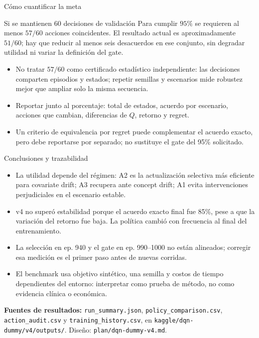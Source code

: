 \documentclass[aspectratio=169,10pt]{beamer}
\begin{document}
\begin{frame}{Cómo cuantificar la meta}
\begin{block}{Si se mantienen 60 decisiones de validación}
Para cumplir \(95\%\) se requieren al menos \(57/60\) acciones coincidentes.
El resultado actual es aproximadamente \(51/60\); hay que reducir al menos
seis desacuerdos en ese conjunto, sin degradar utilidad ni variar la definición
del gate.
\end{block}
\begin{itemize}
  \item No tratar \(57/60\) como certificado estadístico independiente: las
        decisiones comparten episodios y estados; repetir semillas y escenarios
        mide robustez mejor que ampliar solo la misma secuencia.
  \item Reportar junto al porcentaje: total de estados, acuerdo por escenario,
        acciones que cambian, diferencias de \(Q\), retorno y regret.
  \item Un criterio de equivalencia por regret puede complementar el acuerdo
        exacto, pero debe reportarse por separado; no sustituye el gate del
        95\% solicitado.
\end{itemize}
\end{frame}

\begin{frame}{Conclusiones y trazabilidad}
\begin{itemize}
  \item La utilidad depende del régimen: A2 es la actualización selectiva más
        eficiente para covariate drift; A3 recupera ante concept drift; A1
        evita intervenciones perjudiciales en el escenario estable.
  \item v4 no superó estabilidad porque el acuerdo exacto final fue 85\%, pese
        a que la variación del retorno fue baja. La política cambió con
        frecuencia al final del entrenamiento.
  \item La selección en ep. 940 y el gate en ep. 990--1000 no están alineados;
        corregir esa medición es el primer paso antes de nuevas corridas.
  \item El benchmark usa objetivo sintético, una semilla y costos de tiempo
        dependientes del entorno: interpretar como prueba de método,
        no como evidencia clínica o económica.
\end{itemize}
\vspace{0.4em}
\footnotesize
\textbf{Fuentes de resultados:} \texttt{run\_summary.json},
\texttt{policy\_comparison.csv}, \texttt{action\_audit.csv} y
\texttt{training\_history.csv}, en
\texttt{kaggle/dqn-dummy/v4/outputs/}. Diseño: \texttt{plan/dqn-dummy-v4.md}.
\end{frame}
\end{document}
